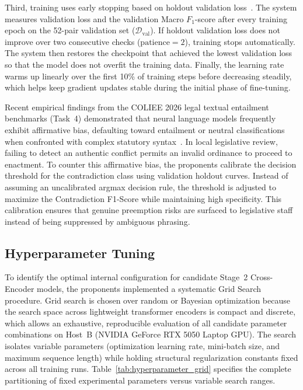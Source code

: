     Third, training uses early stopping based on holdout validation loss~\cite{prechelt1998early}. The system measures validation loss and the validation Macro $F_1$-score after every training epoch on the 52-pair validation set ($\mathcal{D}_{\text{val}}$). If holdout validation loss does not improve over two consecutive checks ($\text{patience} = 2$), training stops automatically. The system then restores the checkpoint that achieved the lowest validation loss so that the model does not overfit the training data. Finally, the learning rate warms up linearly over the first 10\% of training steps before decreasing steadily, which helps keep gradient updates stable during the initial phase of fine-tuning.

    Recent empirical findings from the COLIEE 2026 legal textual entailment benchmarks (Task~4) demonstrated that neural language models frequently exhibit affirmative bias, defaulting toward entailment or neutral classifications when confronted with complex statutory syntax~\cite{alshehri2026cross, tran2026enhancing}. In local legislative review, failing to detect an authentic conflict permits an invalid ordinance to proceed to enactment. To counter this affirmative bias, the proponents calibrate the decision threshold for the contradiction class using validation holdout curves. Instead of assuming an uncalibrated argmax decision rule, the threshold is adjusted to maximize the Contradiction F1-Score while maintaining high specificity. This calibration ensures that genuine preemption risks are surfaced to legislative staff instead of being suppressed by ambiguous phrasing.

    \subsection{Hyperparameter Tuning}
    \label{sec:hyperparameter_tuning}
    To identify the optimal internal configuration for candidate Stage~2 Cross-Encoder models, the proponents implemented a systematic Grid Search procedure. Grid search is chosen over random or Bayesian optimization because the search space across lightweight transformer encoders is compact and discrete, which allows an exhaustive, reproducible evaluation of all candidate parameter combinations on Host~B (NVIDIA GeForce RTX 5050 Laptop GPU). The search isolates variable parameters (optimization learning rate, mini-batch size, and maximum sequence length) while holding structural regularization constants fixed across all training runs. Table~\ref{tab:hyperparameter_grid} specifies the complete partitioning of fixed experimental parameters versus variable search ranges.

